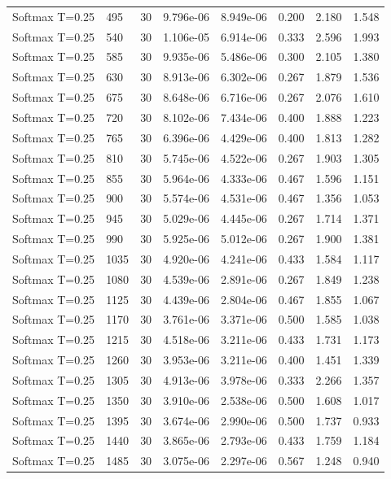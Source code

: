 \begin{scriptsize}
\begin{longtable}{llrrrrrr}
Softmax T=0.25 & 495 & 30 & 9.796e-06 & 8.949e-06 & 0.200 & 2.180 & 1.548 \\
Softmax T=0.25 & 540 & 30 & 1.106e-05 & 6.914e-06 & 0.333 & 2.596 & 1.993 \\
Softmax T=0.25 & 585 & 30 & 9.935e-06 & 5.486e-06 & 0.300 & 2.105 & 1.380 \\
Softmax T=0.25 & 630 & 30 & 8.913e-06 & 6.302e-06 & 0.267 & 1.879 & 1.536 \\
Softmax T=0.25 & 675 & 30 & 8.648e-06 & 6.716e-06 & 0.267 & 2.076 & 1.610 \\
Softmax T=0.25 & 720 & 30 & 8.102e-06 & 7.434e-06 & 0.400 & 1.888 & 1.223 \\
Softmax T=0.25 & 765 & 30 & 6.396e-06 & 4.429e-06 & 0.400 & 1.813 & 1.282 \\
Softmax T=0.25 & 810 & 30 & 5.745e-06 & 4.522e-06 & 0.267 & 1.903 & 1.305 \\
Softmax T=0.25 & 855 & 30 & 5.964e-06 & 4.333e-06 & 0.467 & 1.596 & 1.151 \\
Softmax T=0.25 & 900 & 30 & 5.574e-06 & 4.531e-06 & 0.467 & 1.356 & 1.053 \\
Softmax T=0.25 & 945 & 30 & 5.029e-06 & 4.445e-06 & 0.267 & 1.714 & 1.371 \\
Softmax T=0.25 & 990 & 30 & 5.925e-06 & 5.012e-06 & 0.267 & 1.900 & 1.381 \\
Softmax T=0.25 & 1035 & 30 & 4.920e-06 & 4.241e-06 & 0.433 & 1.584 & 1.117 \\
Softmax T=0.25 & 1080 & 30 & 4.539e-06 & 2.891e-06 & 0.267 & 1.849 & 1.238 \\
Softmax T=0.25 & 1125 & 30 & 4.439e-06 & 2.804e-06 & 0.467 & 1.855 & 1.067 \\
Softmax T=0.25 & 1170 & 30 & 3.761e-06 & 3.371e-06 & 0.500 & 1.585 & 1.038 \\
Softmax T=0.25 & 1215 & 30 & 4.518e-06 & 3.211e-06 & 0.433 & 1.731 & 1.173 \\
Softmax T=0.25 & 1260 & 30 & 3.953e-06 & 3.211e-06 & 0.400 & 1.451 & 1.339 \\
Softmax T=0.25 & 1305 & 30 & 4.913e-06 & 3.978e-06 & 0.333 & 2.266 & 1.357 \\
Softmax T=0.25 & 1350 & 30 & 3.910e-06 & 2.538e-06 & 0.500 & 1.608 & 1.017 \\
Softmax T=0.25 & 1395 & 30 & 3.674e-06 & 2.990e-06 & 0.500 & 1.737 & 0.933 \\
Softmax T=0.25 & 1440 & 30 & 3.865e-06 & 2.793e-06 & 0.433 & 1.759 & 1.184 \\
Softmax T=0.25 & 1485 & 30 & 3.075e-06 & 2.297e-06 & 0.567 & 1.248 & 0.940 \\

\end{longtable}
\end{scriptsize}
